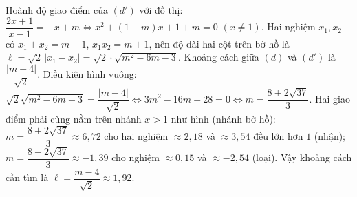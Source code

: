 \begin{ex}
{Hoành độ giao điểm của $(d')$ với đồ thị: $\dfrac{2x+1}{x-1}=-x+m\Leftrightarrow x^2+(1-m)x+1+m=0$ $(x\ne1)$. Hai nghiệm $x_1,x_2$ có $x_1+x_2=m-1$, $x_1x_2=m+1$, nên độ dài hai cột trên bờ hồ là $\ell=\sqrt2\,|x_1-x_2|=\sqrt2\cdot\sqrt{m^2-6m-3}$.
Khoảng cách giữa $(d)$ và $(d')$ là $\dfrac{|m-4|}{\sqrt2}$. Điều kiện hình vuông: $\sqrt2\sqrt{m^2-6m-3}=\dfrac{|m-4|}{\sqrt2}\Leftrightarrow3m^2-16m-28=0\Leftrightarrow m=\dfrac{8\pm2\sqrt{37}}{3}$.
Hai giao điểm phải cùng nằm trên nhánh $x>1$ như hình (nhánh bờ hồ): $m=\dfrac{8+2\sqrt{37}}{3}\approx6{,}72$ cho hai nghiệm $\approx2{,}18$ và $\approx3{,}54$ đều lớn hơn $1$ (nhận); $m=\dfrac{8-2\sqrt{37}}{3}\approx-1{,}39$ cho nghiệm $\approx0{,}15$ và $\approx-2{,}54$ (loại).
Vậy khoảng cách cần tìm là $\ell=\dfrac{m-4}{\sqrt2}\approx1{,}92$.}
\end{ex}
